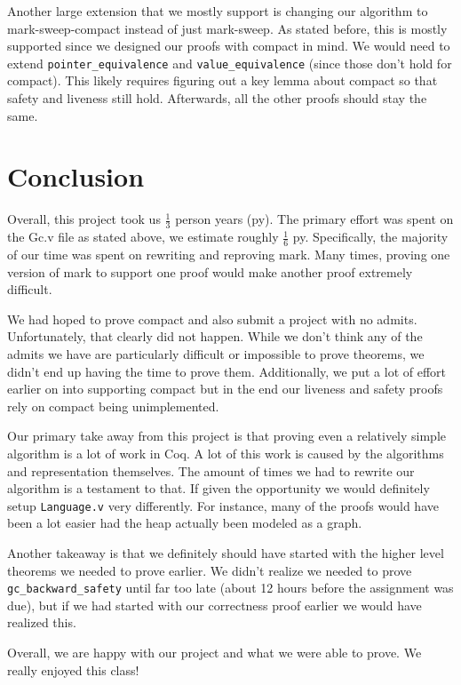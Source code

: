 \documentclass{article}
\begin{document}
Another large extension that we mostly support is changing our algorithm to mark-sweep-compact instead of just mark-sweep. As stated before, this is mostly supported since we designed our proofs with compact in mind. We would need to extend \lstinline|pointer_equivalence| and \lstinline|value_equivalence| (since those don't hold for compact). This likely requires figuring out a key lemma about compact so that safety and liveness still hold. Afterwards, all the other proofs should stay the same.

\section{Conclusion}
Overall, this project took us $\frac{1}{3}$ person years (py). The primary effort was spent on the Gc.v file as stated above, we estimate roughly $\frac{1}{6}$ py. Specifically, the majority of our time was spent on rewriting and reproving mark. Many times, proving one version of mark to support one proof would make another proof extremely difficult.

We had hoped to prove compact and also submit a project with no admits. Unfortunately, that clearly did not happen. While we don't think any of the admits we have are particularly difficult or impossible to prove theorems, we didn't end up having the time to prove them. Additionally, we put a lot of effort earlier on into supporting compact but in the end our liveness and safety proofs rely on compact being unimplemented.

Our primary take away from this project is that proving even a relatively simple algorithm is a lot of work in Coq. A lot of this work is caused by the algorithms and representation themselves. The amount of times we had to rewrite our algorithm is a testament to that. If given the opportunity we would definitely setup \texttt{Language.v} very differently. For instance, many of the proofs would have been a lot easier had the heap actually been modeled as a graph.

Another takeaway is that we definitely should have started with the higher level theorems we needed to prove earlier. We didn't realize we needed to prove \lstinline|gc_backward_safety| until far too late (about 12 hours before the assignment was due), but if we had started with our correctness proof earlier we would have realized this.

Overall, we are happy with our project and what we were able to prove. We really enjoyed this class!
\end{document}
